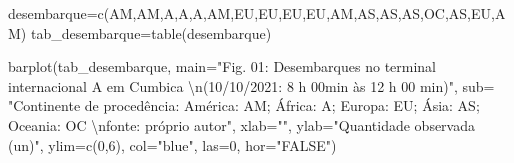 \documentclass[
]{book}
\newenvironment{Shaded}{\begin{snugshade}}{\end{snugshade}}
\newcommand{\AttributeTok}[1]{\textcolor[rgb]{0.77,0.63,0.00}{#1}}
\newcommand{\DecValTok}[1]{\textcolor[rgb]{0.00,0.00,0.81}{#1}}
\newcommand{\FunctionTok}[1]{\textcolor[rgb]{0.00,0.00,0.00}{#1}}
\newcommand{\NormalTok}[1]{#1}
\newcommand{\OtherTok}[1]{\textcolor[rgb]{0.56,0.35,0.01}{#1}}
\newcommand{\SpecialCharTok}[1]{\textcolor[rgb]{0.00,0.00,0.00}{#1}}
\newcommand{\StringTok}[1]{\textcolor[rgb]{0.31,0.60,0.02}{#1}}
\begin{document}
\begin{Shaded}
\begin{Highlighting}[]
\NormalTok{desembarque}\OtherTok{=}\FunctionTok{c}\NormalTok{(}\StringTok{\textquotesingle{}AM\textquotesingle{}}\NormalTok{,}\StringTok{\textquotesingle{}AM\textquotesingle{}}\NormalTok{,}\StringTok{\textquotesingle{}A\textquotesingle{}}\NormalTok{,}\StringTok{\textquotesingle{}A\textquotesingle{}}\NormalTok{,}\StringTok{\textquotesingle{}A\textquotesingle{}}\NormalTok{,}\StringTok{\textquotesingle{}AM\textquotesingle{}}\NormalTok{,}\StringTok{\textquotesingle{}EU\textquotesingle{}}\NormalTok{,}\StringTok{\textquotesingle{}EU\textquotesingle{}}\NormalTok{,}\StringTok{\textquotesingle{}EU\textquotesingle{}}\NormalTok{,}\StringTok{\textquotesingle{}EU\textquotesingle{}}\NormalTok{,}\StringTok{\textquotesingle{}AM\textquotesingle{}}\NormalTok{,}\StringTok{\textquotesingle{}AS\textquotesingle{}}\NormalTok{,}\StringTok{\textquotesingle{}AS\textquotesingle{}}\NormalTok{,}\StringTok{\textquotesingle{}AS\textquotesingle{}}\NormalTok{,}\StringTok{\textquotesingle{}OC\textquotesingle{}}\NormalTok{,}\StringTok{\textquotesingle{}AS\textquotesingle{}}\NormalTok{,}\StringTok{\textquotesingle{}EU\textquotesingle{}}\NormalTok{,}\StringTok{\textquotesingle{}AM\textquotesingle{}}\NormalTok{)}
\NormalTok{tab\_desembarque}\OtherTok{=}\FunctionTok{table}\NormalTok{(desembarque)}

\FunctionTok{barplot}\NormalTok{(tab\_desembarque,}
        \AttributeTok{main=}\StringTok{"Fig. 01: Desembarques no terminal internacional A em Cumbica }\SpecialCharTok{\textbackslash{}n}\StringTok{(10/10/2021: 8 h 00min às 12 h 00 min)"}\NormalTok{,}
        \AttributeTok{sub=} \StringTok{"Continente de procedência: América: AM; África: A; Europa: EU; Ásia: AS; Oceania: OC }\SpecialCharTok{\textbackslash{}n}\StringTok{fonte: próprio autor"}\NormalTok{,}
        \AttributeTok{xlab=}\StringTok{""}\NormalTok{,}
        \AttributeTok{ylab=}\StringTok{"Quantidade observada (un)"}\NormalTok{,}
        \AttributeTok{ylim=}\FunctionTok{c}\NormalTok{(}\DecValTok{0}\NormalTok{,}\DecValTok{6}\NormalTok{),}
        \AttributeTok{col=}\StringTok{"blue"}\NormalTok{,}
        \AttributeTok{las=}\DecValTok{0}\NormalTok{, }
        \AttributeTok{hor=}\StringTok{"FALSE"}\NormalTok{)}
\end{Highlighting}
\end{Shaded}
\end{document}
